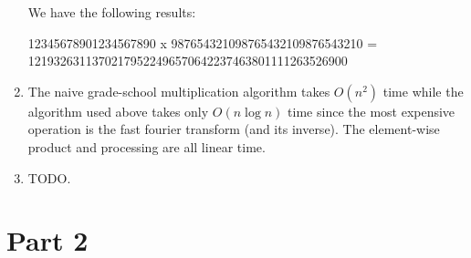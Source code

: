 \documentclass[12pt]{article}
\begin{document}
\begin{enumerate}[label=(\alph*)]
    We have the following results:

    12345678901234567890 x 987654321098765432109876543210 = 12193263113702179522496570642237463801111263526900

  \item
    The naive grade-school multiplication algorithm takes $O(n^2)$ time while the algorithm used above takes only $O(n \log n)$ time since the most expensive operation is the fast fourier transform (and its inverse). The element-wise product and processing are all linear time.

  \item
    TODO.
\end{enumerate}


\newpage
\section*{Part 2}
\end{document}
